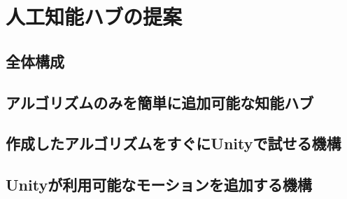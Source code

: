 
\section{人工知能ハブの提案}
\subsection{全体構成}
\subsection{アルゴリズムのみを簡単に追加可能な知能ハブ}
\subsection{作成したアルゴリズムをすぐにUnityで試せる機構}
\subsection{Unityが利用可能なモーションを追加する機構}
